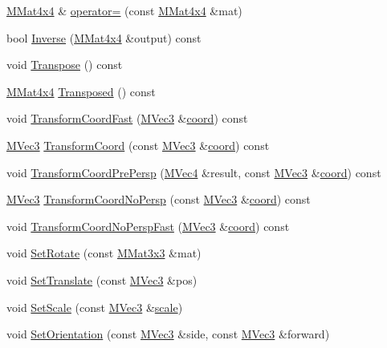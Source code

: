 \begin{CompactItemize}
\hyperlink{class_m_mat4x4}{MMat4x4} \& \hyperlink{class_m_mat4x4_498b45bc7d2108d20db5fe0f7b9f1890}{operator=} (const \hyperlink{class_m_mat4x4}{MMat4x4} \&mat)
\item 
bool \hyperlink{class_m_mat4x4_5045e1a3e2dda8f62a8c3cba29b721db}{Inverse} (\hyperlink{class_m_mat4x4}{MMat4x4} \&output) const 
\item 
void \hyperlink{class_m_mat4x4_d0f028021424a3132bd7eda119094b94}{Transpose} () const 
\item 
\hyperlink{class_m_mat4x4}{MMat4x4} \hyperlink{class_m_mat4x4_6015f2e4f21155e99a953cb768a408b6}{Transposed} () const 
\item 
void \hyperlink{class_m_mat4x4_1ce05837ed33fbbfafc051d23c9ab4e1}{TransformCoordFast} (\hyperlink{class_m_vec3}{MVec3} \&\hyperlink{glext__bak_8h_4ad6f000813afde2b5727cbfdddc75be}{coord}) const 
\item 
\hyperlink{class_m_vec3}{MVec3} \hyperlink{class_m_mat4x4_385cd0e1af4a803cfb38860de8195572}{TransformCoord} (const \hyperlink{class_m_vec3}{MVec3} \&\hyperlink{glext__bak_8h_4ad6f000813afde2b5727cbfdddc75be}{coord}) const 
\item 
void \hyperlink{class_m_mat4x4_9e21fa3a1796f4dc4f393284385222ce}{TransformCoordPrePersp} (\hyperlink{class_m_vec4}{MVec4} \&result, const \hyperlink{class_m_vec3}{MVec3} \&\hyperlink{glext__bak_8h_4ad6f000813afde2b5727cbfdddc75be}{coord}) const 
\item 
\hyperlink{class_m_vec3}{MVec3} \hyperlink{class_m_mat4x4_6433902604e11fbc092ba36be233d2a1}{TransformCoordNoPersp} (const \hyperlink{class_m_vec3}{MVec3} \&\hyperlink{glext__bak_8h_4ad6f000813afde2b5727cbfdddc75be}{coord}) const 
\item 
void \hyperlink{class_m_mat4x4_ea380b26ff885243bda1f33dd851177b}{TransformCoordNoPerspFast} (\hyperlink{class_m_vec3}{MVec3} \&\hyperlink{glext__bak_8h_4ad6f000813afde2b5727cbfdddc75be}{coord}) const 
\item 
void \hyperlink{class_m_mat4x4_37d2e5026e682b64a60ee7343cd814e9}{SetRotate} (const \hyperlink{class_m_mat3x3}{MMat3x3} \&mat)
\item 
void \hyperlink{class_m_mat4x4_ac06f72b0de0177bf7a98ccf4ddc5ed2}{SetTranslate} (const \hyperlink{class_m_vec3}{MVec3} \&pos)
\item 
void \hyperlink{class_m_mat4x4_8ed6ef9ec48dacf59eda26bb8e3b721d}{SetScale} (const \hyperlink{class_m_vec3}{MVec3} \&\hyperlink{glext__bak_8h_281421b881aa7a1266842b73a3bc7655}{scale})
\item 
void \hyperlink{class_m_mat4x4_95954820693d983fc18428eb935e1b01}{SetOrientation} (const \hyperlink{class_m_vec3}{MVec3} \&side, const \hyperlink{class_m_vec3}{MVec3} \&forward)

\end{CompactItemize}
